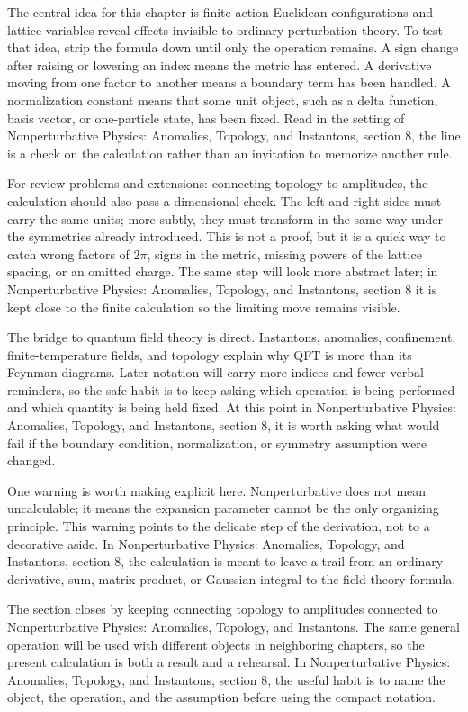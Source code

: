 The central idea for this chapter is finite-action Euclidean configurations and lattice variables reveal effects invisible to ordinary perturbation theory.  To test that idea, strip the formula down until only the operation remains.  A sign change after raising or lowering an index means the metric has entered.  A derivative moving from one factor to another means a boundary term has been handled.  A normalization constant means that some unit object, such as a delta function, basis vector, or one-particle state, has been fixed.  Read in the setting of Nonperturbative Physics: Anomalies, Topology, and Instantons, section 8, the line is a check on the calculation rather than an invitation to memorize another rule.

For review problems and extensions: connecting topology to amplitudes, the calculation should also pass a dimensional check.  The left and right sides must carry the same units; more subtly, they must transform in the same way under the symmetries already introduced.  This is not a proof, but it is a quick way to catch wrong factors of \(2\pi\), signs in the metric, missing powers of the lattice spacing, or an omitted charge.  The same step will look more abstract later; in Nonperturbative Physics: Anomalies, Topology, and Instantons, section 8 it is kept close to the finite calculation so the limiting move remains visible.

The bridge to quantum field theory is direct.  Instantons, anomalies, confinement, finite-temperature fields, and topology explain why QFT is more than its Feynman diagrams.  Later notation will carry more indices and fewer verbal reminders, so the safe habit is to keep asking which operation is being performed and which quantity is being held fixed.  At this point in Nonperturbative Physics: Anomalies, Topology, and Instantons, section 8, it is worth asking what would fail if the boundary condition, normalization, or symmetry assumption were changed.

One warning is worth making explicit here.  Nonperturbative does not mean uncalculable; it means the expansion parameter cannot be the only organizing principle.  This warning points to the delicate step of the derivation, not to a decorative aside.  In Nonperturbative Physics: Anomalies, Topology, and Instantons, section 8, the calculation is meant to leave a trail from an ordinary derivative, sum, matrix product, or Gaussian integral to the field-theory formula.

The section closes by keeping connecting topology to amplitudes connected to Nonperturbative Physics: Anomalies, Topology, and Instantons.  The same general operation will be used with different objects in neighboring chapters, so the present calculation is both a result and a rehearsal.  In Nonperturbative Physics: Anomalies, Topology, and Instantons, section 8, the useful habit is to name the object, the operation, and the assumption before using the compact notation.



